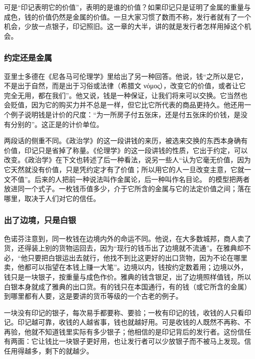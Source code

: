 可是“印记表明它的价值”，表明的是谁的价值？如果印记只是证明了金属的重量与成色，钱的价值仍然是金属的价值。一旦大家习惯了数而不称，发行者就有了一个机会，少放一点银子，印记照旧。这一章的大半，讲的就是发行者怎样用掉这个机会。

\subsubsection{约定还是金属}
亚里士多德在《尼各马可伦理学》里给出了另一种回答。他说，钱“之所以是它，不是出于自然，而是出于习俗或法律（希腊文 νόμος），改变它的价值，或者让它完全无用，都在我们”。他又说，钱是一种保证，让我们将来可以交换。它当然也会贬值，因为它的购买力并不总是一样，但它比它所代表的商品更持久\cite{ethics}。他还用一个例子说明钱是计价的尺度：“为一所房子付五张床，还是付五张床的价钱，是没有分别的”\cite{ethics}。这正是的计价单位。

两段话的侧重不同。《政治学》的这一段讲钱的来历，被选来交换的东西本身确有价值，印记只是省掉了称量。《伦理学》的这一段讲钱的性质，它出于约定，可以改变。《政治学》在下文也转述了后一种看法，说另一些人“认为它毫无价值，因为它天然就没有价值，只是凭约定才有了价值；所以用它的人一旦改变主意，它就一文不值”\cite{politics}。后来的人把前一种说法叫作金属论，后一种叫作名目论。 的模型把两者放进同一个式子。一枚钱币值多少，介于它所含的金属与它的法定价值之间；落在哪里，取决于人们对它的信任。

\subsubsection{出了边境，只是白银}
色诺芬注意到，同一枚钱在边境内外的命运不同。他说，在大多数城邦，商人卖了货，还得装上别的货物运回去，因为“现行的钱币出了边境就不流通”。在雅典却不必，“他只要把白银运出去就行，他找不到比这更好的出口货物，因为不论在哪里卖，他都可以指望在本钱上赚一大笔”\cite{xenrev}。边境以内，钱按约定数着用；边境以外，钱只是一块银子，按重量与成色作价。雅典的钱含银足，出了边境照样值钱，所以白银本身就成了雅典的出口货。有的钱只在本国通行，有的钱（或它所含的金属）到哪里都有人要，这是要讲的货币等级的一个古老的例子。

\begin{intuition}[印记是一种担保]
一块没有印记的银子，每次易手都要称、要验；一枚有印记的钱，收钱的人只看印记。印记越可靠，收钱的人越省事，钱也就越好用。可是收钱的人既然不再称、不再验，他就不知道钱里实际有多少银子；他相信的是印记背后的发行者。这份信任有两面：它让钱比一块银子更好用，也让发行者可以少放银子而不被马上发现。信任用得越多，剩下的就越少。
\end{intuition}

